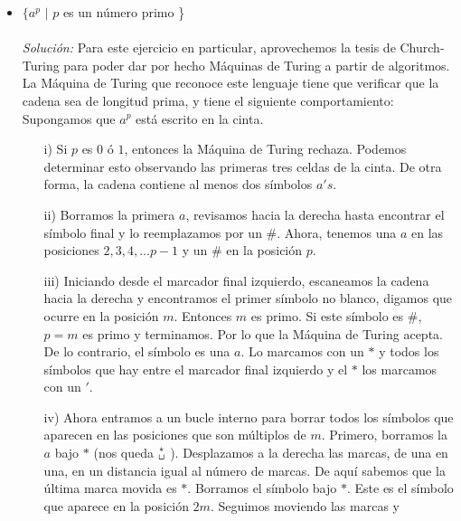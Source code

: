 \documentclass[letterpaper,10pt]{article}
\begin{document}
\begin{enumerate}
\begin{itemize}
            \newpage
           \item $\{a^{p}$ $|$ $p$ es un número primo \} \\ \\
           \textit{Solución:} Para este ejercicio en particular, aprovechemos 
           la tesis de Church-Turing para poder dar por hecho Máquinas de
           Turing a partir de algoritmos. La Máquina de Turing que reconoce este
           lenguaje tiene que verificar que la cadena sea de longitud prima, y 
           tiene el siguiente comportamiento: \\
           Supongamos que $a^{p}$ está escrito en la cinta.
           \begin{itemize}
               \item[i)] Si $p$ es $0$ ó $1$, entonces la Máquina de Turing
               rechaza. Podemos determinar esto observando las primeras
               tres celdas de la cinta. De otra forma, la cadena contiene
               al menos dos símbolos $a's$.
               \item[ii)] Borramos la primera $a$, revisamos hacia la
               derecha hasta encontrar el símbolo final y lo reemplazamos
               por un $\#$. Ahora, tenemos una $a$ en las posiciones
               $2, 3, 4, ... p-1$ y un $\#$ en la posición $p$.
               \item[iii)] Iniciando desde el marcador final izquierdo,
               escaneamos la cadena hacia la derecha y encontramos el 
               primer símbolo no blanco, digamos que ocurre en la posición
               $m$. Entonces $m$ es primo. Si este símbolo es $\#$, $p=m$
               es primo y terminamos. Por lo que la Máquina de Turing acepta.
               De lo contrario, el símbolo es una $a$. Lo marcamos con un
               $*$ y todos los símbolos que hay entre el marcador final
               izquierdo y el $*$ los marcamos con un $'$.
               \item[iv)] Ahora entramos a un bucle interno para borrar todos
               los símbolos que aparecen en las posiciones que son múltiplos
               de $m$. Primero, borramos la $a$ bajo $*$ (nos queda 
               $\stackrel{*}{\texttt{\char32}}$ ). Desplazamos a la derecha las
               marcas, de una en una, en un distancia igual al número de
               marcas. De aquí sabemos que la última marca movida es $*$.
               Borramos el símbolo bajo $*$. Este es el símbolo que aparece
               en la posición $2m$. Seguimos moviendo las marcas y

\end{itemize}
\end{itemize}
\end{enumerate}
\end{document}

